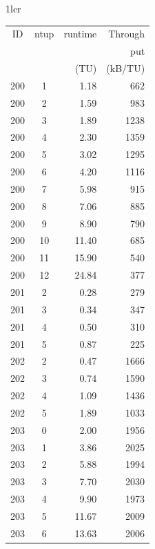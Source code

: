 \documentclass[
  digital,     %
  oneside,     %
  nosansbold,  %
  nocolorbold, %
  nolof,         %
  nolot,         %
]{fithesis4}
\begin{document}
\begin{table}[H]
  \begin{tabularx}{1\textwidth}{lcr}
    {\begin{tabularx}{0.5\textwidth}{c|c|r|r}
        ID & ntup & runtime & Through\\
         & & & put \\
         & & (TU) & (kB/TU) \\
        \midrule
        200 & 1 & 1.18 & 662 \\
        200 & 2 & 1.59 & 983 \\
        200 & 3 & 1.89 & 1238 \\
        200 & 4 & 2.30 & 1359 \\
        200 & 5 & 3.02 & 1295 \\
        200 & 6 & 4.20 & 1116 \\
        200 & 7 & 5.98 & 915 \\
        200 & 8 & 7.06 & 885 \\
        200 & 9 & 8.90 & 790 \\
        200 & 10 & 11.40 & 685 \\
        200 & 11 & 15.90 & 540 \\
        200 & 12 & 24.84 & 377 \\
        201 & 2 & 0.28 & 279 \\
        201 & 3 & 0.34 & 347 \\
        201 & 4 & 0.50 & 310 \\
        201 & 5 & 0.87 & 225 \\
        202 & 2 & 0.47 & 1666 \\
        202 & 3 & 0.74 & 1590 \\
        202 & 4 & 1.09 & 1436 \\
        202 & 5 & 1.89 & 1033 \\
        203 & 0 & 2.00 & 1956 \\
        203 & 1 & 3.86 & 2025 \\
        203 & 2 & 5.88 & 1994 \\
        203 & 3 & 7.70 & 2030 \\
        203 & 4 & 9.90 & 1973 \\
        203 & 5 & 11.67 & 2009 \\
        203 & 6 & 13.63 & 2006 \\
    \end{tabularx}} 


\end{tabularx}
\end{table}
\end{document}
